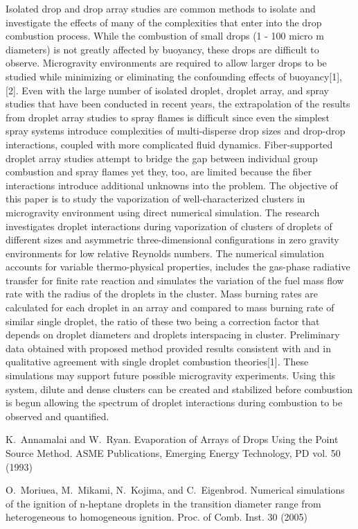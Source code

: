 Isolated drop and drop array studies are common methods to isolate and investigate the effects of many of the complexities that enter into the drop combustion process. While the combustion of small drops (1 - 100 micro m diameters) is not greatly affected by buoyancy, these drops are difficult to observe. Microgravity environments are required to allow larger drops to be studied while minimizing or eliminating the confounding effects of buoyancy[1],[2]. Even with the large number of isolated droplet, droplet array, and spray studies that have been conducted in recent years, the extrapolation of the results from droplet array studies to spray flames is difficult since even the simplest spray systems introduce complexities of multi-disperse drop sizes and drop-drop interactions, coupled with more complicated fluid dynamics. Fiber-supported droplet array studies attempt to bridge the gap between individual group combustion and spray flames yet they, too, are limited because the fiber interactions introduce additional unknowns into the problem. The objective of this paper is to study the vaporization of well-characterized clusters in microgravity environment using direct numerical simulation. The research investigates droplet interactions during vaporization of clusters of droplets of different sizes and asymmetric three-dimensional configurations in zero gravity environments for low relative Reynolds numbers. The numerical simulation accounts for variable thermo-physical properties, includes the gas-phase radiative transfer for finite rate reaction and simulates the variation of the fuel mass flow rate with the radius of the droplets in the cluster. Mass burning rates are calculated for each droplet in an array and compared to mass burning rate of similar single droplet, the ratio of these two being a correction factor that depends on droplet diameters and droplets interspacing in cluster. Preliminary data obtained with proposed method provided results consistent with and in qualitative agreement with single droplet combustion theories[1]. These simulations may support future possible microgravity experiments. Using this system, dilute and dense clusters can be created and stabilized before combustion is begun allowing the spectrum of droplet interactions during combustion to be observed and quantified.


\begin{thebibliography}{10}

{\sc K.~Annamalai and W.~Ryan}. {Evaporation of Arrays of Drops Using the Point Source Method}. ASME Publications, Emerging Energy Technology, PD vol. 50 (1993)

{\sc O.~Moriuea, M.~Mikami, N.~Kojima, and C.~Eigenbrod}. {Numerical simulations of the ignition of n-heptane droplets in the transition diameter range from heterogeneous to homogeneous ignition}. Proc. of Comb. Inst. 30 (2005)

\end{thebibliography}